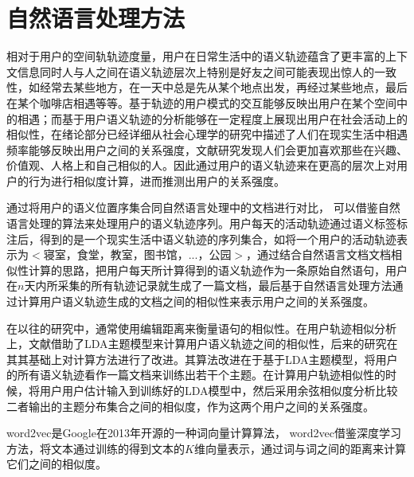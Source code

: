 \section{自然语言处理方法}
\label{sec:section2-3}
相对于用户的空间轨轨迹度量，用户在日常生活中的语义轨迹蕴含了更丰富的上下文信息同时人与人之间在语义轨迹层次上特别是好友之间可能表现出惊人的一致性，如经常去某些地方，在一天中总是先从某个地点出发，再经过某些地点，最后在某个咖啡店相遇等等。基于轨迹的用户模式的交互能够反映出用户在某个空间中的相遇；而基于用户语义轨迹的分析能够在一定程度上展现出用户在社会活动上的相似性，在绪论部分已经详细从社会心理学的研究中描述了人们在现实生活中相遇频率能够反映出用户之间的关系强度，文献\cite{singelis1994measurement}研究发现人们会更加喜欢那些在兴趣、价值观、人格上和自己相似的人。因此通过用户的语义轨迹来在更高的层次上对用户的行为进行相似度计算，进而推测出用户的关系强度。
\par 通过将用户的语义位置序集合同自然语言处理中的文档进行对比， 可以借鉴自然语言处理的算法来处理用户的语义轨迹序列。用户每天的活动轨迹通过语义标签标注后，得到的是一个现实生活中语义轨迹的序列集合，如将一个用户的活动轨迹表示为$<寝室，食堂，教室，图书馆，...，公园>$，通过结合自然语言文档文档相似性计算的思路，把用户每天所计算得到的语义轨迹作为一条原始自然语句，用户在$n$天内所采集的所有轨迹记录就生成了一篇文档，最后基于自然语言处理方法通过计算用户语义轨迹生成的文档之间的相似性来表示用户之间的关系强度。
\par 在以往的研究中，通常使用编辑距离来衡量语句的相似性。在用户轨迹相似分析上，文献\cite{farrahi2008did}借助了LDA主题模型来计算用户语义轨迹之间的相似性，后来的研究在其其基础上对计算方法进行了改进。其算法改进在于基于LDA主题模型，将用户的所有语义轨迹看作一篇文档来训练出若干个主题。在计算用户轨迹相似性的时候，将用户用户估计输入到训练好的LDA模型中，然后采用余弦相似度分析比较二者输出的主题分布集合之间的相似度，作为这两个用户之间的关系强度。
\par word2vec是Google在2013年开源的一种词向量计算算法， word2vec借鉴深度学习方法，将文本通过训练的得到文本的$K$维向量表示，通过词与词之间的距离来计算它们之间的相似度。
